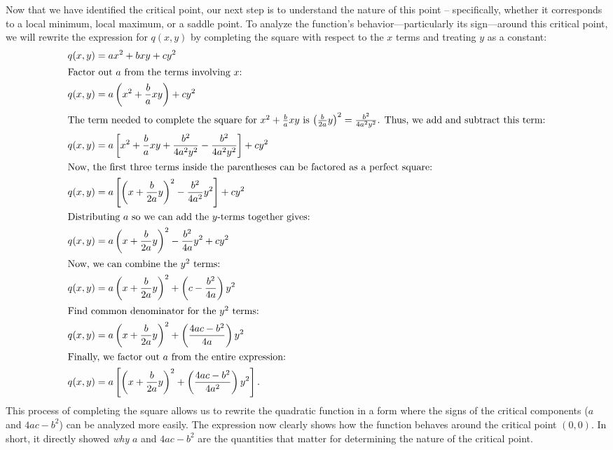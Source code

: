 \documentclass{article}
\begin{document}
Now that we have identified the critical point, our next step is to understand the nature of this point – specifically, whether it corresponds to a local minimum, local maximum, or a saddle point. To analyze the function's behavior---particularly its sign---around this critical point, we will rewrite the expression for \( q(x, y) \) by completing the square with respect to the \( x \) terms and treating \( y \) as a constant:
\begin{align*}
	q(x, y) &= ax^2 + bxy + cy^2 \\
	\intertext{Factor out \( a \) from the terms involving \( x \):}
	q(x, y) &= a\left(x^2 + \frac{b}{a}xy\right) + cy^2 \\
	\intertext{The term needed to complete the square for \( x^{2} + \frac{b}{a}xy \) is \( \left(\frac{b}{2a}y\right)^{2} = \frac{b^{2}}{4a^{2}y^{2}} \). Thus, we add and subtract this term:} 
	q(x, y) &= a\left[x^2 + \frac{b}{a}xy + \frac{b^{2}}{4a^{2}y^{2}} - \frac{b^{2}}{4a^{2}y^{2}}\right] + cy^2 \\
	\intertext{Now, the first three terms inside the parentheses can be factored as a perfect square:}
	q(x, y) &= a\left[\left(x + \frac{b}{2a}y\right)^2 - \frac{b^{2}}{4a^{2}}y^{2}\right] + cy^2 \\
	\intertext{Distributing \( a \) so we can add the \( y \)-terms together gives:}
	q(x, y) &= a\left(x + \frac{b}{2a}y\right)^2 - \frac{b^2}{4a}y^2 + cy^2 \\
	\intertext{Now, we can combine the \( y^2 \) terms:}
	q(x, y) &= a\left(x + \frac{b}{2a}y\right)^2 + \left( c - \frac{b^{2}}{4a} \right)y^2 \\
	\intertext{Find common denominator for the \( y^2 \) terms:}
	q(x, y) &= a\left(x + \frac{b}{2a}y\right)^2 + \left( \frac{4ac - b^{2}}{4a} \right)y^{2} \\
	\intertext{Finally, we factor out \( a \) from the entire expression:}
	q(x, y) &= a\left[\left(x + \frac{b}{2a}y\right)^2 + \left(\frac{4ac - b^2}{4a^{2}}\right)y^2\right].
\end{align*}
This process of completing the square allows us to rewrite the quadratic function in a form where the signs of the critical components (\( a \) and \( 4ac - b^2 \)) can be analyzed more easily. The expression now clearly shows how the function behaves around the critical point \( (0, 0) \). In short, it directly showed \textit{why} \( a \) and \( 4ac - b^{2} \) are the quantities that matter for determining the nature of the critical point. \\
\end{document}
